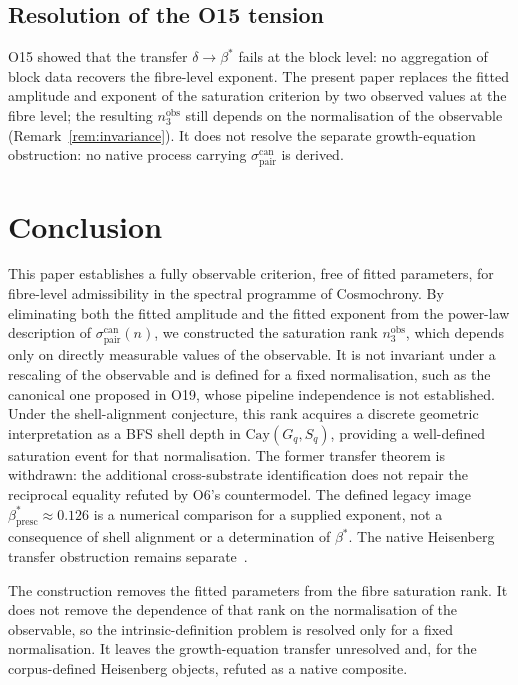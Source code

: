 \documentclass[11pt,a4paper]{article}
\theoremstyle{definition}
\theoremstyle{remark}
\begin{document}
  \subsection{Resolution of the O15 tension}

    O15 showed that the transfer $\delta \to \beta^*$ fails at
    the block level: no aggregation of block data recovers the
    fibre-level exponent.
    The present paper replaces the fitted amplitude and exponent
    of the saturation criterion by two observed values at the
    fibre level; the resulting $n_3^{\mathrm{obs}}$ still depends
    on the normalisation of the observable
    (Remark~\ref{rem:invariance}).
    It does not resolve the separate growth-equation obstruction:
    no native process carrying
    $\sigma_{\mathrm{pair}}^{\mathrm{can}}$ is derived.

  \section{Conclusion}
  \label{sec:conclusion}

  This paper establishes a fully observable criterion, free of
  fitted parameters, for fibre-level admissibility in the
  spectral programme of Cosmochrony.
  By eliminating both the fitted amplitude and the fitted exponent
  from the power-law description of
  $\sigma_{\mathrm{pair}}^{\mathrm{can}}(n)$, we constructed
  the saturation rank $n_3^{\mathrm{obs}}$, which depends only
  on directly measurable values of the observable.
  It is not invariant under a rescaling of the observable and is
  defined for a fixed normalisation, such as the canonical one proposed in O19, whose
  pipeline independence is not established.
  Under the shell-alignment conjecture, this rank acquires a
  discrete geometric interpretation as a BFS shell depth in
  $\mathrm{Cay}(G_q, S_q)$, providing a well-defined saturation
  event for that normalisation.
  The former transfer theorem is withdrawn: the additional cross-substrate identification
  does not repair the reciprocal equality refuted by O6's countermodel.
  The defined legacy image $\beta^*_{\mathrm{presc}}\approx0.126$ is a numerical comparison
  for a supplied exponent, not a consequence of shell alignment or a determination of $\beta^*$.
  The native Heisenberg transfer obstruction remains separate~\cite{Beau2026sgn}.

  The construction removes the fitted parameters from the fibre
  saturation rank.
  It does not remove the dependence of that rank on the
  normalisation of the observable, so the intrinsic-definition
  problem is resolved only for a fixed normalisation.
  It leaves the growth-equation transfer unresolved and, for the
  corpus-defined Heisenberg objects, refuted as a native
  composite.
\end{document}
